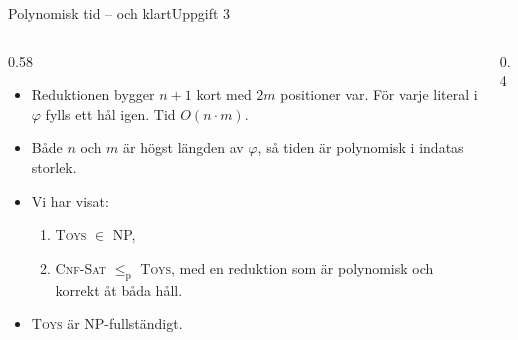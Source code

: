 \documentclass[aspectratio=169,10pt]{beamer}
\newcommand{\prob}[1]{\textsc{#1}}
\newcommand{\lep}{\le_{\mathrm{p}}}
\begin{document}
\begin{frame}{Polynomisk tid -- och klart}{Uppgift 3}
  \begin{columns}[T]
    \begin{column}{0.58\textwidth}
      \begin{itemize}
        \item<1-> Reduktionen bygger $n+1$ kort med $2m$ positioner var. För varje literal i $\varphi$ fylls ett hål igen. Tid $O(n\cdot m)$.
        \item<2-> Både $n$ och $m$ är högst längden av $\varphi$, så tiden är polynomisk i indatas storlek.
        \item<3-> Vi har visat:
          \begin{enumerate}
            \item \prob{Toys} $\in$ NP,
            \item \prob{Cnf-Sat} $\lep$ \prob{Toys}, med en reduktion som är polynomisk och korrekt åt båda håll.
          \end{enumerate}
        \item<4-> \prob{Toys} är NP-fullständigt.
      \end{itemize}
    \end{column}
    \begin{column}{0.4\textwidth}
    \end{column}
  \end{columns}
\end{frame}
\end{document}
